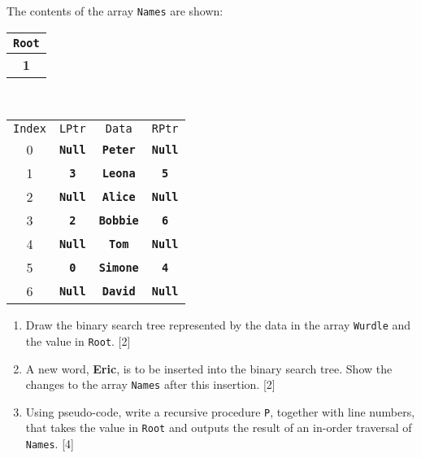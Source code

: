 The contents of the array \texttt{Names} are shown: 
\begin{center}
\textbf{}%
\begin{tabular}{|c|}
\hline 
\texttt{Root}\tabularnewline
\hline 
\textbf{1}\tabularnewline
\hline 
\end{tabular}\textbf{~}%
\begin{tabular}{c|c|c|c|}
\multicolumn{1}{c}{\texttt{Index}} & \multicolumn{1}{c}{\texttt{LPtr}} & \multicolumn{1}{c}{\texttt{Data}} & \multicolumn{1}{c}{\texttt{RPtr}}\tabularnewline
\cline{2-4} \cline{3-4} \cline{4-4} 
0 & \texttt{\textbf{Null}} & \texttt{\textbf{Peter}} & \texttt{\textbf{Null}}\tabularnewline
\cline{2-4} \cline{3-4} \cline{4-4} 
1 & \texttt{\textbf{3}} & \texttt{\textbf{Leona}} & \texttt{\textbf{5}}\tabularnewline
\cline{2-4} \cline{3-4} \cline{4-4} 
2 & \texttt{\textbf{Null}} & \texttt{\textbf{Alice}} & \texttt{\textbf{Null}}\tabularnewline
\cline{2-4} \cline{3-4} \cline{4-4} 
3 & \texttt{\textbf{2}} & \texttt{\textbf{Bobbie}} & \texttt{\textbf{6}}\tabularnewline
\cline{2-4} \cline{3-4} \cline{4-4} 
4 & \texttt{\textbf{Null}} & \texttt{\textbf{Tom}} & \texttt{\textbf{Null}}\tabularnewline
\cline{2-4} \cline{3-4} \cline{4-4} 
5 & \texttt{\textbf{0}} & \texttt{\textbf{Simone}} & \texttt{\textbf{4}}\tabularnewline
\cline{2-4} \cline{3-4} \cline{4-4} 
6 & \texttt{\textbf{Null}} & \texttt{\textbf{David}} & \texttt{\textbf{Null}}\tabularnewline
\cline{2-4} \cline{3-4} \cline{4-4} 
\end{tabular}
\par\end{center}
\begin{enumerate}
\item Draw the binary search tree represented by the data in the array \texttt{Wurdle}
and the value in \texttt{Root}. \hfill{}{[}2{]}
\item A new word, \textbf{Eric}, is to be inserted into the binary search
tree. Show the changes to the array \texttt{Names} after this insertion.
\hfill{}{[}2{]}
\item Using pseudo-code, write a recursive procedure \texttt{P}, together
with line numbers, that takes the value in \texttt{Root} and outputs
the result of an in-order traversal of \texttt{Names}.\hfill{} {[}4{]}
\end{enumerate}